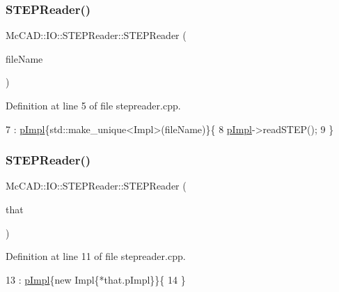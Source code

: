 \subsubsection{\texorpdfstring{S\+T\+E\+P\+Reader()}{STEPReader()}\hspace{0.1cm}{\footnotesize\ttfamily [1/6]}}
{\footnotesize\ttfamily Mc\+C\+A\+D\+::\+I\+O\+::\+S\+T\+E\+P\+Reader\+::\+S\+T\+E\+P\+Reader (\begin{DoxyParamCaption}\item[{const std\+::string \&}]{file\+Name }\end{DoxyParamCaption})}



Definition at line 5 of file stepreader.\+cpp.


\begin{DoxyCode}
7     : \hyperlink{classMcCAD_1_1IO_1_1STEPReader_a3bbb72987d6bad33c403c85401c62160}{pImpl}\{std::make\_unique<Impl>(fileName)\}\{
8   \hyperlink{classMcCAD_1_1IO_1_1STEPReader_a3bbb72987d6bad33c403c85401c62160}{pImpl}->readSTEP();
9 \}
\end{DoxyCode}
\mbox{\label{classMcCAD_1_1IO_1_1STEPReader_a031c5146e7c40dfbc605b1075ccffec5}} 
\subsubsection{\texorpdfstring{S\+T\+E\+P\+Reader()}{STEPReader()}\hspace{0.1cm}{\footnotesize\ttfamily [2/6]}}
{\footnotesize\ttfamily Mc\+C\+A\+D\+::\+I\+O\+::\+S\+T\+E\+P\+Reader\+::\+S\+T\+E\+P\+Reader (\begin{DoxyParamCaption}\item[{const \hyperlink{classMcCAD_1_1IO_1_1STEPReader}{S\+T\+E\+P\+Reader} \&}]{that }\end{DoxyParamCaption})}



Definition at line 11 of file stepreader.\+cpp.


\begin{DoxyCode}
13     : \hyperlink{classMcCAD_1_1IO_1_1STEPReader_a3bbb72987d6bad33c403c85401c62160}{pImpl}\{\textcolor{keyword}{new} Impl\{*that.pImpl\}\}\{
14 \}
\end{DoxyCode}
\mbox{\label{classMcCAD_1_1IO_1_1STEPReader_a6098f3bc5d2ae6e4663e1b26b0348767}} 
